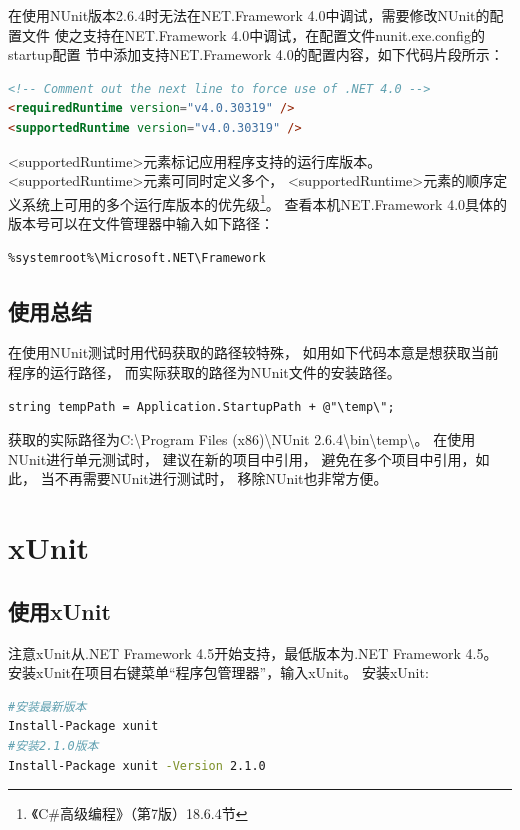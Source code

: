 \documentclass{book}
\begin{document}
在使用NUnit版本2.6.4时无法在NET.Framework 4.0中调试，需要修改NUnit的配置文件
使之支持在NET.Framework 4.0中调试，在配置文件nunit.exe.config的startup配置
节中添加支持NET.Framework 4.0的配置内容，如下代码片段所示：

\begin{lstlisting}[language=HTML]
<!-- Comment out the next line to force use of .NET 4.0 -->
<requiredRuntime version="v4.0.30319" />
<supportedRuntime version="v4.0.30319" />
\end{lstlisting}

<supportedRuntime>元素标记应用程序支持的运行库版本。
<supportedRuntime>元素可同时定义多个，
<supportedRuntime>元素的顺序定义系统上可用的多个运行库版本的优先级\footnote{《C\#高级编程》（第7版）18.6.4节}。
查看本机NET.Framework 4.0具体的版本号可以在文件管理器中输入如下路径：
\begin{lstlisting}
%systemroot%\Microsoft.NET\Framework
\end{lstlisting}

\subsection{使用总结}


在使用NUnit测试时用代码获取的路径较特殊，
如用如下代码本意是想获取当前程序的运行路径，
而实际获取的路径为NUnit文件的安装路径。

\begin{lstlisting}[language={[Sharp]C}]
string tempPath = Application.StartupPath + @"\temp\";
\end{lstlisting}

获取的实际路径为C:\textbackslash Program Files (x86)\textbackslash NUnit 2.6.4\textbackslash bin\textbackslash temp\textbackslash 。
在使用NUnit进行单元测试时，
建议在新的项目中引用，
避免在多个项目中引用，如此，
当不再需要NUnit进行测试时，
移除NUnit也非常方便。

\section{xUnit}

\subsection{使用xUnit}

注意xUnit从.NET Framework 4.5开始支持，最低版本为.NET Framework 4.5。
安装xUnit在项目右键菜单“程序包管理器”，输入xUnit。
安装xUnit:

\begin{lstlisting}[language=Bash]
#安装最新版本
Install-Package xunit
#安装2.1.0版本
Install-Package xunit -Version 2.1.0
\end{lstlisting}
\end{document}
